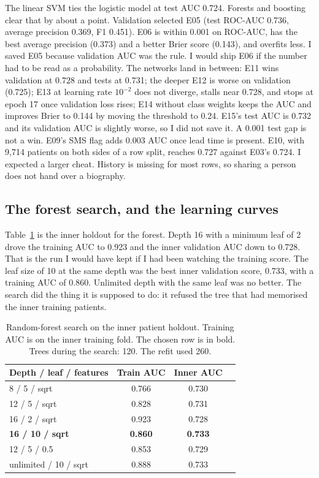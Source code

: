 \documentclass[conference]{IEEEtran}
\begin{document}
The linear SVM ties the logistic model at test AUC 0.724. Forests and boosting clear that by about a point. Validation selected E05 (test ROC-AUC 0.736, average precision 0.369, F1 0.451). E06 is within 0.001 on ROC-AUC, has the best average precision (0.373) and a better Brier score (0.143), and overfits less. I saved E05 because validation AUC was the rule. I would ship E06 if the number had to be read as a probability. The networks land in between: E11 wins validation at 0.728 and tests at 0.731; the deeper E12 is worse on validation (0.725); E13 at learning rate $10^{-2}$ does not diverge, stalls near 0.728, and stops at epoch 17 once validation loss rises; E14 without class weights keeps the AUC and improves Brier to 0.144 by moving the threshold to 0.24. E15's test AUC is 0.732 and its validation AUC is slightly worse, so I did not save it. A 0.001 test gap is not a win. E09's SMS flag adds 0.003 AUC once lead time is present. E10, with 9,714 patients on both sides of a row split, reaches 0.727 against E03's 0.724. I expected a larger cheat. History is missing for most rows, so sharing a person does not hand over a biography.

\subsection{The forest search, and the learning curves}
Table~\ref{tab:rf} is the inner holdout for the forest. Depth 16 with a minimum leaf of 2 drove the training AUC to 0.923 and the inner validation AUC down to 0.728. That is the run I would have kept if I had been watching the training score. The leaf size of 10 at the same depth was the best inner validation score, 0.733, with a training AUC of 0.860. Unlimited depth with the same leaf was no better. The search did the thing it is supposed to do: it refused the tree that had memorised the inner training patients.

\begin{table}[t]
\centering
\caption{Random-forest search on the inner patient holdout. Training AUC is on the inner training fold. The chosen row is in bold. Trees during the search: 120. The refit used 260.}
\label{tab:rf}
\footnotesize
\begin{tabular}{lccc}
\toprule
Depth / leaf / features & Train AUC & Inner AUC \\
\midrule
8 / 5 / sqrt & 0.766 & 0.730 \\
12 / 5 / sqrt & 0.828 & 0.731 \\
16 / 2 / sqrt & 0.923 & 0.728 \\
\textbf{16 / 10 / sqrt} & \textbf{0.860} & \textbf{0.733} \\
12 / 5 / 0.5 & 0.853 & 0.729 \\
unlimited / 10 / sqrt & 0.888 & 0.733 \\
\bottomrule
\end{tabular}
\end{table}
\end{document}
